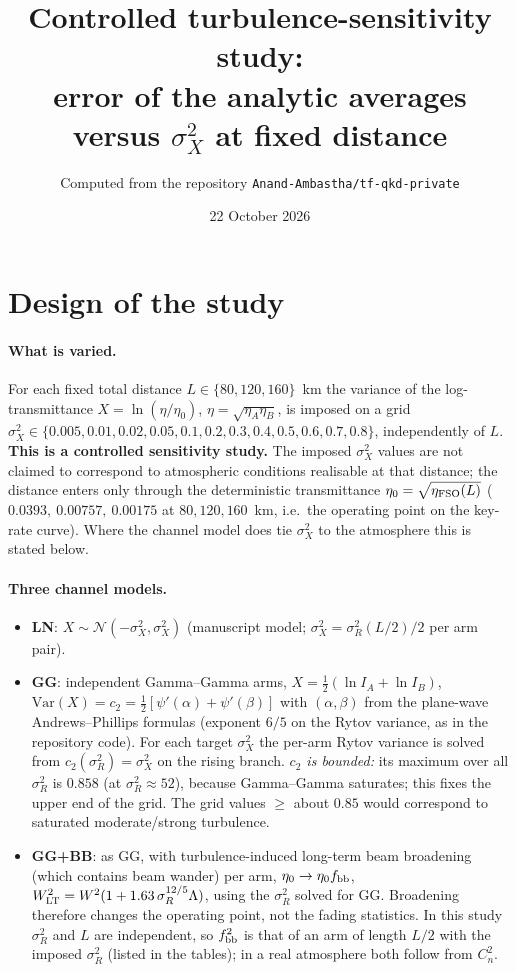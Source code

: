 \documentclass[11pt,a4paper]{article}
\title{Controlled turbulence-sensitivity study:\\ error of the analytic averages versus $\sigma_X^2$ at fixed distance}
\author{Computed from the repository \texttt{Anand-Ambastha/tf-qkd-private}}
\date{22 October 2026}
\begin{document}
\maketitle

\section{Design of the study}
\paragraph{What is varied.} For each fixed total distance $L\in\{80,120,160\}$~km the variance of the log-transmittance $X=\ln(\eta/\eta_0)$, $\eta=\sqrt{\eta_A\eta_B}$, is imposed on a grid $\sigma_X^2\in\{0.005,0.01,0.02,0.05,0.1,0.2,0.3,0.4,0.5,0.6,0.7,0.8\}$, independently of $L$. \textbf{This is a controlled sensitivity study.} The imposed $\sigma_X^2$ values are not claimed to correspond to atmospheric conditions realisable at that distance; the distance enters only through the deterministic transmittance $\eta_0=\sqrt{\eta_{\rm FSO}(L)}$ ($0.0393,\ 0.00757,\ 0.00175$ at $80,120,160$~km, i.e.\ the operating point on the key-rate curve). Where the channel model does tie $\sigma_X^2$ to the atmosphere this is stated below.

\paragraph{Three channel models.}
\begin{itemize}
\item \textbf{LN}: $X\sim\mathcal N(-\sigma_X^2,\sigma_X^2)$ (manuscript model; $\sigma_X^2=\sigma_R^2(L/2)/2$ per arm pair).
\item \textbf{GG}: independent Gamma--Gamma arms, $X=\tfrac12(\ln I_A+\ln I_B)$, $\mathrm{Var}(X)=c_2=\tfrac12[\psi'(\alpha)+\psi'(\beta)]$ with $(\alpha,\beta)$ from the plane-wave Andrews--Phillips formulas (exponent $6/5$ on the Rytov variance, as in the repository code). For each target $\sigma_X^2$ the per-arm Rytov variance is solved from $c_2(\sigma_R^2)=\sigma_X^2$ on the rising branch. \emph{$c_2$ is bounded:} its maximum over all $\sigma_R^2$ is $0.858$ (at $\sigma_R^2\approx52$), because Gamma--Gamma saturates; this fixes the upper end of the grid. The grid values $\ge$ about $0.85$ would correspond to saturated moderate/strong turbulence.
\item \textbf{GG+BB}: as GG, with turbulence-induced long-term beam broadening (which contains beam wander) per arm, $\eta_0\to\eta_0f_{\rm bb}$, $W_{\rm LT}^2=W^2(1+1.63\,\sigma_R^{12/5}\Lambda)$, using the $\sigma_R^2$ solved for GG. Broadening therefore changes the operating point, not the fading statistics. In this study $\sigma_R^2$ and $L$ are independent, so $f_{\rm bb}^2$ is that of an arm of length $L/2$ with the imposed $\sigma_R^2$ (listed in the tables); in a real atmosphere both follow from $C_n^2$.
\end{itemize}
\end{document}
